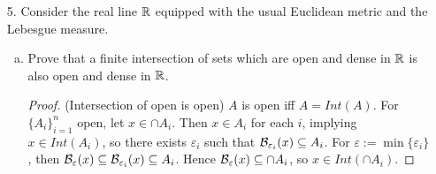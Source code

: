 \begin{itemize}
\begin{enumerate}[(a)]
\begin{proof}
$(\Rightarrow)$ Let $||x|| = ||y|| = 1$. While not obvious, introducing $y$ makes the computations more  manageable. Let $m = \sup\{|\ip{Tx}{x} : ||x|| \leq 1|\}$, so that $|\ip{Tu}{u}| \leq m \ ||u||^2$. This inequality can be seen by $u \mapsto \frac{u}{||u||}$.
$$\ip{T(x \pm y)}{x \pm y} = \ip{Tx}{x} \pm 2|\ip{Tx}{y}| + \ip{Ty}{y}.$$
Thus we see by subtracting the $+$ and $-$ cases that 
\begin{align*}
    |\ip{Tx}{y}| &\leq \frac{1}{4}\left|\ip{T(x + y)}{x + y} - \ip{T(x - y)}{x - y}\right| \\
    &\leq \frac{1}{4}\left( |\ip{T(x + y)}{x + y}| + |\ip{T(x - y)}{x - y}| \right) \\
    &\leq \frac{1}{4}\left( m \ ||x+y||^2 + m \ ||x-y||^2 \right) \\
    &\leq \frac{m}{4}\left( ||x+y||^2 + ||x-y||^2 \right) \\
    &\leq \frac{m}{4}\left( 2||x||^2 + 2||y||^2 \right) \\
    &= m.
\end{align*}
This takes advantage of the Parallelogram identity. 

\medskip 

Now that we have $|\ip{Tx}{y}| \leq \sup_{||x|| \leq 1|} \{|\ip{Tx}{x}\}$, setting $y=\frac{||x|| \ Tx}{||Tx||}$ gives $||x|| \ ||Tx|| \leq m \ ||x||^2$, thus $||T|| = \frac{||Tx||}{||x||} \leq m$.
\end{proof}

\item Prove that (a) is in general not true if $T$ is not assumed to be self-adjoint.
\begin{proof}
Consider $T$ being a $90^{\circ}$ rotation in the plane. Then $\ip{Tx}{x} = 0$ for all $x$. This suggests $||T||=0$. But this rotation preserves distances; it is an isometry, thus $||T||=1$. Contradiction. 
\end{proof}
\end{enumerate}




\item[5.] \label{q:w21-5} Consider the real line $\mathbb{R}$ equipped with the usual Euclidean metric and the
Lebesgue measure.
\begin{enumerate}[(a)]
\item Prove that a finite intersection of sets which are open and dense in $\mathbb{R}$ is also open and dense in $\mathbb{R}$.
\begin{proof}
(Intersection of open is open) $A$ is open iff $A = Int(A)$. For $\{A_i\}_{i=1}^n$ open, let $x \in \cap A_i$. Then $x \in A_i$ for each $i$, implying $x \in Int(A_i)$, so there exists $\varepsilon_i$ such that $\mathcal{B}_{\varepsilon_i}(x) \subseteq A_i$. For $\varepsilon := \min\{\varepsilon_i\}$, then $\mathcal{B}_{\varepsilon}(x) \subseteq \mathcal{B}_{\varepsilon_i}(x) \subseteq A_i$. Hence $\mathcal{B}_{\varepsilon}(x) \subseteq \cap A_i$, so $x \in Int(\cap A_i)$.


\end{proof}
\end{enumerate}
\end{itemize}
